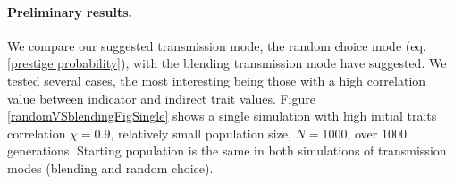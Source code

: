 \documentclass[11pt]{article}
\begin{document}
   \paragraph*{Preliminary results.}
   We compare our suggested transmission mode, the random choice mode (eq.\ref{prestige probability}), with the blending transmission mode \citet[eq. 8.9, 8.10]{evolutionBook} have suggested. %
We tested several cases, the most interesting being those with a high correlation value between indicator and indirect trait values. %
Figure \ref{randomVSblendingFigSingle} shows a single simulation with high initial traits correlation $\chi = 0.9$, relatively small population size, $N=1000$, over $1000$ generations. Starting population is the same in both simulations of transmission modes (blending and random choice).\\
\end{document}
